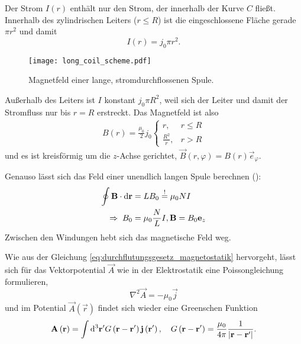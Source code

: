 Der Strom $I\left(r\right)$ enthält nur den Strom, der innerhalb der Kurve $C$ fließt. Innerhalb des zylindrischen Leiters ($r\leq R$) ist die eingeschlossene Fläche gerade $\pi r^{2}$ und damit
\begin{equation*}
	I\left(r\right)=j_{0}\pi r^{2}.
\end{equation*}


\begin{figure}[htb]
	\centering
	\texttt{[image: long\_coil\_scheme.pdf]}
	\caption{Magnetfeld einer lange, stromdurchflossenen Spule. }
	\label{fig:long_coil_scheme}
\end{figure}

Außerhalb des Leiters ist $I$ konstant $j_{0}\pi R^{2}$, weil sich der Leiter und damit der Stromfluss nur bis $r=R$ erstreckt. Das Magnetfeld ist also
\begin{align*}
	B\left(r\right)=\frac{\mu _{0}}{2}j_{0}\begin{cases} r,               & r\leq R \\
              \frac{R^{2}}{r}, & r>R
	                                       \end{cases}
\end{align*}
und es ist kreisförmig um die $z$-Achse gerichtet, $\vec {B}\left(r,\varphi \right)=B\left(r\right)\vec {e}_{\varphi }$.

Genauso lässt sich das Feld einer unendlich langen Spule berechnen ():
\begin{align*}
	\oint \mathbf{B}\cdot \mathop{}\!\mathrm{d} \mathbf{r} & =LB_{0}\overset{!}{=}\mu _{0}NI                   \\
	\;\Rightarrow\; B_{0}                 & =\mu _{0}\frac{N}{L}I, \mathbf{B}=B_{0}\mathbf{e}_{z}
\end{align*}
Zwischen den Windungen hebt sich das magnetische Feld weg.

Wie aus der Gleichung \eqref{eq:durchflutungsgesetz_magnetostatik} hervorgeht, lässt sich für das Vektorpotential $\vec {A}$ wie in der Elektrostatik eine Poissongleichung formulieren,
\begin{equation*}
	\nabla ^{2}\vec {A}=-\mu _{0}\vec {j}
\end{equation*}
und im Potential $\vec {A}\left(\vec {r}\right)$ findet sich wieder eine Greenschen Funktion
\begin{equation*}
	\mathbf{A}\left(\mathbf{r}\right)=\int \mathop{}\!\mathrm{d} ^{3}\mathbf{r}'G\left(\mathbf{r}-\mathbf{r}'\right)\mathbf{j}\left(\mathbf{r}'\right),\quad G\left(\mathbf{r}-\mathbf{r}'\right)=\frac{\mu _{0}}{4\pi }\frac{1}{\left| \mathbf{r}-\mathbf{r}'\right| }.
\end{equation*}


